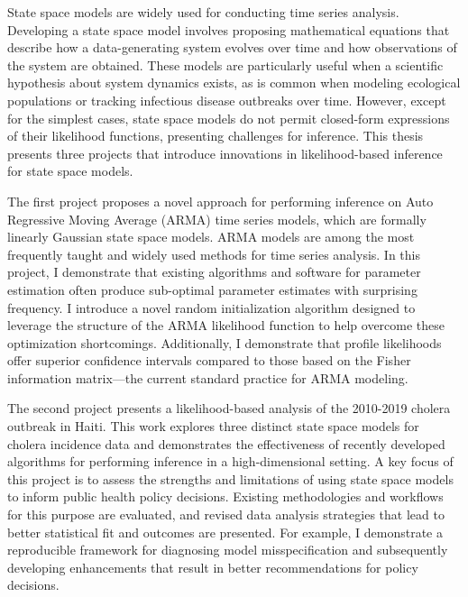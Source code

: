 State space models are widely used for conducting time series analysis.
Developing a state space model involves proposing mathematical equations that describe how a data-generating system evolves over time and how observations of the system are obtained.
These models are particularly useful when a scientific hypothesis about system dynamics exists, as is common when modeling ecological populations or tracking infectious disease outbreaks over time.
However, except for the simplest cases, state space models do not permit closed-form expressions of their likelihood functions, presenting challenges for inference.
This thesis presents three projects that introduce innovations in likelihood-based inference for state space models.

The first project proposes a novel approach for performing inference on Auto Regressive Moving Average (ARMA) time series models, which are formally linearly Gaussian state space models.
ARMA models are among the most frequently taught and widely used methods for time series analysis.
In this project, I demonstrate that existing algorithms and software for parameter estimation often produce sub-optimal parameter estimates with surprising frequency.
I introduce a novel random initialization algorithm designed to leverage the structure of the ARMA likelihood function to help overcome these optimization shortcomings.
Additionally, I demonstrate that profile likelihoods offer superior confidence intervals compared to those based on the Fisher information matrix---the current standard practice for ARMA modeling.

The second project presents a likelihood-based analysis of the 2010-2019 cholera outbreak in Haiti.
This work explores three distinct state space models for cholera incidence data and demonstrates the effectiveness of recently developed algorithms for performing inference in a high-dimensional setting.
A key focus of this project is to assess the strengths and limitations of using state space models to inform public health policy decisions.
Existing methodologies and workflows for this purpose are evaluated, and revised data analysis strategies that lead to better statistical fit and outcomes are presented.
For example, I demonstrate a reproducible framework for diagnosing model misspecification and subsequently developing enhancements that result in better recommendations for policy decisions.


